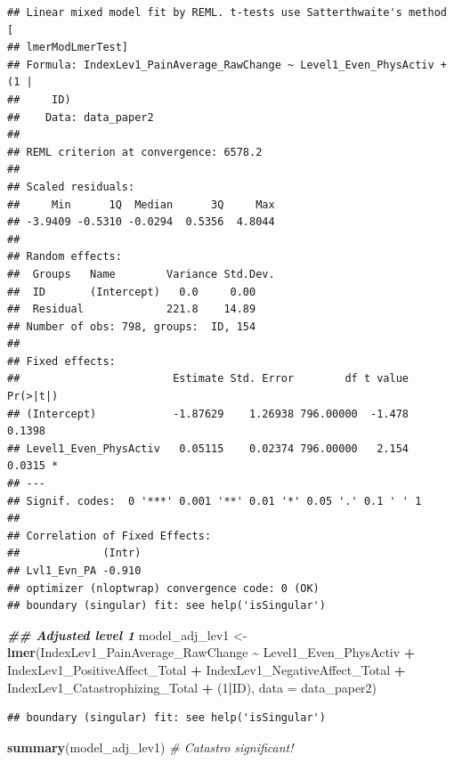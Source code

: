 \documentclass[
  12pt,
]{article}
\newenvironment{Shaded}{\begin{snugshade}}{\end{snugshade}}
\newcommand{\AttributeTok}[1]{\textcolor[rgb]{0.13,0.29,0.53}{#1}}
\newcommand{\CommentTok}[1]{\textcolor[rgb]{0.56,0.35,0.01}{\textit{#1}}}
\newcommand{\DecValTok}[1]{\textcolor[rgb]{0.00,0.00,0.81}{#1}}
\newcommand{\DocumentationTok}[1]{\textcolor[rgb]{0.56,0.35,0.01}{\textbf{\textit{#1}}}}
\newcommand{\FunctionTok}[1]{\textcolor[rgb]{0.13,0.29,0.53}{\textbf{#1}}}
\newcommand{\NormalTok}[1]{#1}
\newcommand{\OtherTok}[1]{\textcolor[rgb]{0.56,0.35,0.01}{#1}}
\newcommand{\SpecialCharTok}[1]{\textcolor[rgb]{0.81,0.36,0.00}{\textbf{#1}}}
\begin{document}
\begin{verbatim}
## Linear mixed model fit by REML. t-tests use Satterthwaite's method [
## lmerModLmerTest]
## Formula: IndexLev1_PainAverage_RawChange ~ Level1_Even_PhysActiv + (1 |  
##     ID)
##    Data: data_paper2
## 
## REML criterion at convergence: 6578.2
## 
## Scaled residuals: 
##     Min      1Q  Median      3Q     Max 
## -3.9409 -0.5310 -0.0294  0.5356  4.8044 
## 
## Random effects:
##  Groups   Name        Variance Std.Dev.
##  ID       (Intercept)   0.0     0.00   
##  Residual             221.8    14.89   
## Number of obs: 798, groups:  ID, 154
## 
## Fixed effects:
##                        Estimate Std. Error        df t value Pr(>|t|)  
## (Intercept)            -1.87629    1.26938 796.00000  -1.478   0.1398  
## Level1_Even_PhysActiv   0.05115    0.02374 796.00000   2.154   0.0315 *
## ---
## Signif. codes:  0 '***' 0.001 '**' 0.01 '*' 0.05 '.' 0.1 ' ' 1
## 
## Correlation of Fixed Effects:
##             (Intr)
## Lvl1_Evn_PA -0.910
## optimizer (nloptwrap) convergence code: 0 (OK)
## boundary (singular) fit: see help('isSingular')
\end{verbatim}

\begin{Shaded}
\begin{Highlighting}[]
\DocumentationTok{\#\# Adjusted level 1}
\NormalTok{model\_adj\_lev1 }\OtherTok{\textless{}{-}} \FunctionTok{lmer}\NormalTok{(IndexLev1\_PainAverage\_RawChange }\SpecialCharTok{\textasciitilde{}}\NormalTok{ Level1\_Even\_PhysActiv }\SpecialCharTok{+}\NormalTok{ IndexLev1\_PositiveAffect\_Total }\SpecialCharTok{+}\NormalTok{ IndexLev1\_NegativeAffect\_Total }\SpecialCharTok{+}\NormalTok{ IndexLev1\_Catastrophizing\_Total }\SpecialCharTok{+}\NormalTok{ (}\DecValTok{1}\SpecialCharTok{|}\NormalTok{ID), }\AttributeTok{data =}\NormalTok{ data\_paper2)}
\end{Highlighting}
\end{Shaded}

\begin{verbatim}
## boundary (singular) fit: see help('isSingular')
\end{verbatim}

\begin{Shaded}
\begin{Highlighting}[]
\FunctionTok{summary}\NormalTok{(model\_adj\_lev1) }\CommentTok{\# Catastro significant! }
\end{Highlighting}
\end{Shaded}
\end{document}
